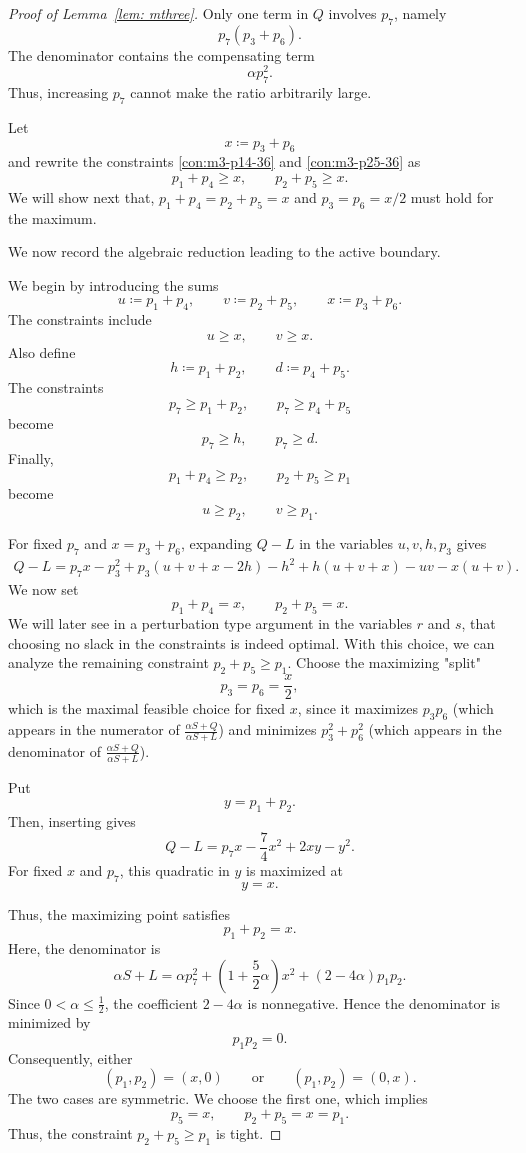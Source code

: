 \documentclass[%
english, titlepage=false %
]{./tum-templates/book/tumbook}
\begin{document}
\begin{proof}[\hypertarget{proof:mthree}{Proof of Lemma~\ref{lem: mthree}}]
Only one term in \(Q\) involves \(p_7\), namely
\[
p_7(p_3+p_6).
\]
The denominator contains the compensating term
\[
\alpha p_7^2.
\]
Thus, increasing \(p_7\) cannot make the ratio
arbitrarily large.

Let
\[
x\coloneqq p_3+p_6
\]
and rewrite the constraints \ref{con:m3-p14-36} and \ref{con:m3-p25-36} as
\[
p_1+p_4\ge x,\qquad p_2+p_5\ge x.
\]
We will show next that, \(p_1+p_4=p_2+p_5=x\) and \(p_3=p_6=x/2\) must hold for the maximum.

We now record the algebraic reduction leading to the active boundary.

We begin by introducing the sums
\[
u \coloneqq p_1+p_4,\qquad v \coloneqq p_2+p_5,\qquad x\coloneqq p_3+p_6.
\]
The constraints include
\[
u\ge x,\qquad v\ge x.
\]
Also define
\[
h\coloneqq p_1+p_2,\qquad d \coloneqq p_4+p_5.
\]
The constraints
\[
p_7\ge p_1+p_2,\qquad p_7\ge p_4+p_5
\]
become
\[
p_7\ge h,\qquad p_7\ge d.
\]
Finally,
\[
p_1+p_4\ge p_2,\qquad p_2+p_5\ge p_1
\]
become
\[
u\ge p_2,\qquad v\ge p_1.
\]

For fixed \(p_7\) and \(x=p_3+p_6\), expanding \(Q-L\) in the variables
\(u,v,h,p_3\) gives
\[
\begin{aligned}
Q-L
=p_7x-p_3^2+p_3(u+v+x-2h)-h^2
+h(u+v+x)-uv-x(u+v).
\end{aligned}
\]
We now set
\[
p_1+p_4=x,\qquad p_2+p_5=x.
\]
We will later see in a perturbation type argument in the variables $r$ and $s$, that choosing no slack in 
the constraints is indeed optimal. 
With this choice, we can analyze the remaining constraint \(p_2+p_5\ge p_1\). Choose the
maximizing "split"
\[
p_3=p_6=\frac{x}{2},
\]
which is the maximal feasible choice for fixed \(x\), since it maximizes
\(p_3p_6\) (which appears in the numerator of $\frac{\alpha S + Q}{\alpha S+L}$) and minimizes \(p_3^2+p_6^2\) (which appears in the denominator of $\frac{\alpha S + Q}{\alpha S+L}$).

Put
\[
y=p_1+p_2.
\]
Then, inserting gives
\[
Q-L
=
p_7x-\frac74x^2+2xy-y^2.
\]
For fixed \(x\) and \(p_7\), this quadratic in \(y\) is maximized at
\begin{equation}\label{Wolfram7}
y=x. 
\end{equation}

Thus, the maximizing point satisfies
\[
p_1+p_2=x.
\]
Here, the denominator is
\[
\alpha S+L
=
\alpha p_7^2
+\left(1+\frac52\alpha\right)x^2
+(2-4\alpha)p_1p_2.
\]
Since \(0<\alpha\le \frac12\), the coefficient \(2-4\alpha\) is
nonnegative. Hence the denominator is minimized by
\[
p_1p_2=0.
\]
Consequently, either
\[
(p_1,p_2)=(x,0)
\qquad\text{or}\qquad
(p_1,p_2)=(0,x).
\]
The two cases are symmetric. We choose the first one, which implies
\[
p_5=x,\qquad p_2+p_5=x=p_1.
\]
Thus, the constraint
\(p_2+p_5\ge p_1\) is tight.


\end{proof}
\end{document}
